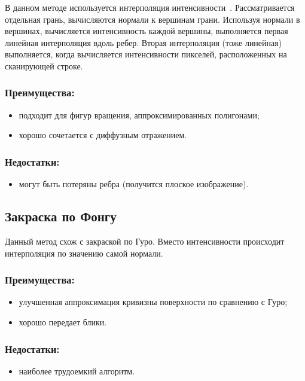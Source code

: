 В данном методе используется интерполяция интенсивности~\cite{cul}. Рассматривается отдельная грань, вычисляются нормали к вершинам грани. Используя нормали в вершинах, вычисляется интенсивность каждой вершины, выполняется первая линейная интерполяция вдоль ребер. Вторая интерполяция (тоже линейная) выполняется, когда вычисляется интенсивности пикселей, расположенных на сканирующей строке. 

\subsubsection*{Преимущества:}
\begin{itemize}[label=---]
	\item подходит для фигур вращения, аппроксимированных полигонами;
	\item хорошо сочетается с диффузным отражением.
\end{itemize}

\subsubsection*{Недостатки:}
\begin{itemize}[label=---]
	\item могут быть потеряны ребра (получится плоское изображение).
\end{itemize}


\subsection{Закраска по Фонгу}

Данный метод схож с закраской по Гуро. Вместо интенсивности происходит интерполяция по значению самой нормали.

\subsubsection*{Преимущества:}
\begin{itemize}[label=---]
	\item улучшенная аппроксимация кривизны поверхности по сравнению с Гуро;
	\item хорошо передает блики.
\end{itemize}

\subsubsection*{Недостатки:}
\begin{itemize}[label=---]
	\item наиболее трудоемкий алгоритм.
\end{itemize}


